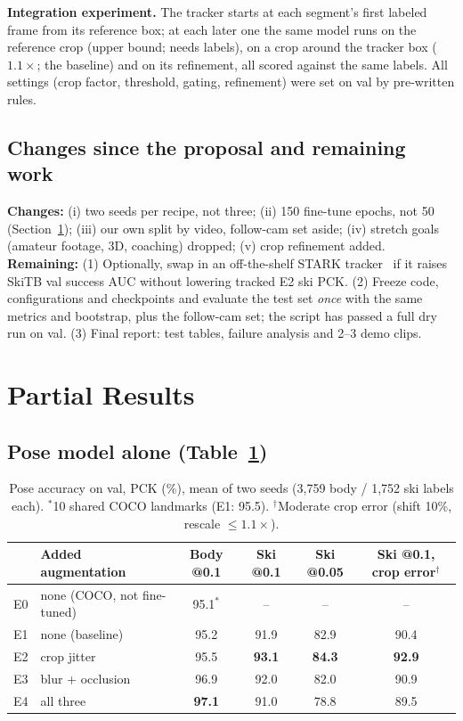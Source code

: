 \documentclass{article}
\begin{document}
\textbf{Integration experiment.} The tracker starts at each segment's first labeled frame from its reference box; at
each later one the same model runs on the reference crop (upper bound; needs labels), on a crop around
the tracker box ($1.1\times$; the baseline) and on its refinement, all scored against the same labels. All settings
(crop factor, threshold, gating, refinement) were set on val by pre-written rules.

\subsection{Changes since the proposal and remaining work}
\textbf{Changes:} (i) two seeds per recipe, not three; (ii) 150 fine-tune epochs, not 50
(Section~\ref{sec:results}); (iii) our own split by video, follow-cam set aside; (iv)
stretch goals (amateur footage, 3D, coaching) dropped; (v) crop refinement added.
\textbf{Remaining:} (1) Optionally, swap in an off-the-shelf STARK tracker~\cite{yan2021learning} if it
raises SkiTB val success AUC without lowering tracked E2 ski PCK. (2) Freeze code, configurations and
checkpoints and evaluate the test set \emph{once} with the same metrics and bootstrap, plus the follow-cam set; the
script has passed a full dry run on val. (3) Final report: test tables, failure analysis and
2--3 demo clips.

\section{Partial Results}\label{sec:results}
\subsection{Pose model alone (Table~\ref{tab:pose})}

\begin{table}[h]
  \centering
  \small
  \begin{tabular}{llcccc}
    \toprule
    & Added augmentation & Body @0.1 & Ski @0.1 & Ski @0.05 & Ski @0.1, crop error$^{\dagger}$ \\
    \midrule
    E0 & none (COCO, not fine-tuned) & 95.1$^{*}$ & -- & -- & -- \\
    E1 & none (baseline) & 95.2 & 91.9 & 82.9 & 90.4 \\
    E2 & crop jitter & 95.5 & \textbf{93.1} & \textbf{84.3} & \textbf{92.9} \\
    E3 & blur + occlusion & 96.9 & 92.0 & 82.0 & 90.9 \\
    E4 & all three & \textbf{97.1} & 91.0 & 78.8 & 89.5 \\
    \bottomrule
  \end{tabular}
  \caption{Pose accuracy on val, PCK (\%), mean of two seeds (3,759 body / 1,752 ski labels each). $^{*}$10 shared
  COCO landmarks (E1: 95.5). $^{\dagger}$Moderate crop error (shift 10\%, rescale $\leq 1.1\times$).}
  \label{tab:pose}
\end{table}
\end{document}
